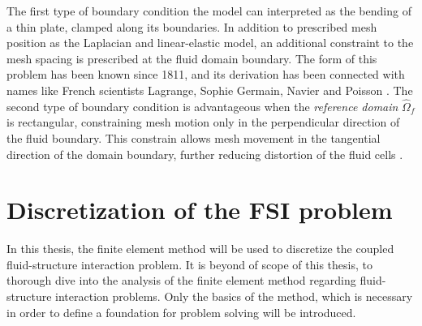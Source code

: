 The first type of boundary condition the model can interpreted as the bending of a thin plate, clamped along its boundaries. In addition to prescribed mesh position as the Laplacian and linear-elastic model, an additional constraint to the mesh spacing is prescribed at the fluid domain boundary. The form of this problem has been known since 1811, and its derivation has been connected with names like French scientists Lagrange, Sophie Germain, Navier and Poisson \cite{Meleshko1997}. The second type of boundary condition is advantageous when the \textit{reference domain} $\hat{\Omega}_f$ is rectangular, constraining mesh motion only in the perpendicular direction of the fluid boundary. This constrain allows mesh movement in the tangential direction of the domain boundary, further reducing distortion of the fluid cells \cite{Wicka}.  
\newpage
\newpage
\section{Discretization of the FSI problem}
In this thesis, the finite element method will be used to discretize the coupled fluid-structure interaction problem. It is beyond of scope of this thesis, to thorough dive into the analysis of the finite element method regarding fluid-structure interaction problems. Only the basics of the method, which is necessary in order to define a foundation for problem solving will be introduced. 
